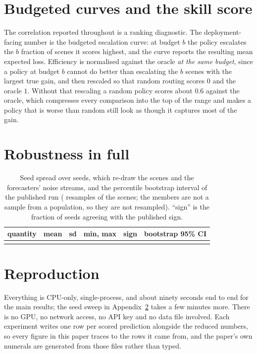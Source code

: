 \documentclass[10pt]{article}
\begin{document}
\FloatBarrier
\section{Budgeted curves and the skill score}
\label{app:curves}

The correlation reported throughout is a ranking diagnostic. The deployment-facing number is the
budgeted escalation curve: at budget $b$ the policy escalates the $b$ fraction of scenes it scores
highest, and the curve reports the resulting mean expected loss. Efficiency is normalised against
the oracle \emph{at the same budget}, since a policy at budget $b$ cannot do better than escalating
the $b$ scenes with the largest true gain, and then rescaled so that random routing scores $0$ and
the oracle $1$. Without that rescaling a random policy scores about $0.6$ against the oracle, which
compresses every comparison into the top of the range and makes a policy that is worse than random
still look as though it captures most of the gain.



\FloatBarrier
\section{Robustness in full}
\label{app:robustness}

\begin{table}[h]
\centering
\small
\caption{Seed spread over \RobSeeds{} seeds, which re-draw the scenes and the forecasters' noise
streams, and the percentile bootstrap interval of the published run (\RobBoot{} resamples of the
scenes; the members are not a sample from a population, so they are not resampled). ``sign'' is
the fraction of seeds agreeing with the published sign.}
\label{tab:robustness}
\begin{tabular}{@{}p{}ccccc@{}}
\toprule
quantity & mean & sd & min, max & sign & bootstrap 95\% CI \\
\midrule
 \\
\bottomrule
\end{tabular}
\end{table}

\FloatBarrier
\section{Reproduction}
\label{app:repro}

Everything is CPU-only, single-process, and about ninety seconds end to end for the main results;
the seed sweep in Appendix~\ref{app:robustness} takes a few minutes more. There is no GPU, no
network access, no API key and no data file involved. Each experiment writes one row per scored
prediction alongside the reduced numbers, so every figure in this paper traces to the rows it came
from, and the paper's own numerals are generated from those files rather than typed.


\end{document}
